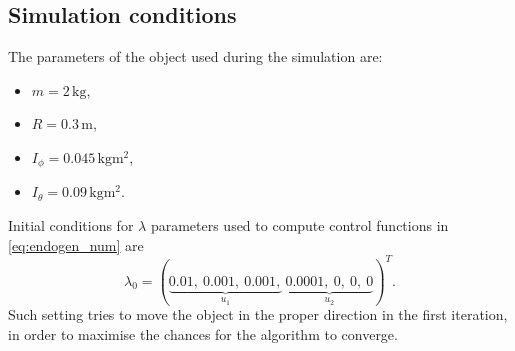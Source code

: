 \subsection{Simulation conditions}
\label{sec:discont_params_uni}
The parameters of the object used during the simulation are:
\begin{multicols}{2}
\begin{itemize}
\item $m=2 \,\mathrm{kg}$,
\item $R=0.3 \,\mathrm{m}$,
\item $I_\phi =0.045\,\mathrm{kgm^2}$,
\item $I_\theta =0.09\,\mathrm{kgm^2}$. 
\end{itemize}
\end{multicols}
Initial conditions for $\lambda$ parameters used to compute control functions
in \eqref{eq:endogen_num} are
\begin{equation}
\lambda_0=
(\underbrace{0.01, \ 0.001, \ 0.001,}_{u_1}\ \underbrace{0.0001, \ 0, \ 0, \ 0}_{u_2})^T.
\end{equation}
Such setting tries to move the object in the proper direction in the first iteration, in order to
maximise the chances for the algorithm to converge.

